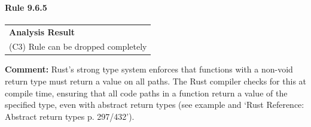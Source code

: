 \paragraph{Rule 9.6.5}
\begin{longtable}{p{13cm}}
\textbf{Analysis Result} \\
(C3) Rule can be dropped completely \\
\end{longtable}
\textbf{Comment:} Rust's strong type system enforces that functions with a non-void return type must return a value on all paths. The Rust compiler checks for this at compile time, ensuring that all code paths in a function return a value of the specified type, even with abstract return types (see example and `Rust Reference: Abstract return types p. 297/432'). \\


